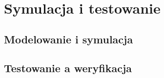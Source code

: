 \section{Symulacja i testowanie}
\label{sub:testowanie}



\subsection{Modelowanie i symulacja}
\label{sub:modelowanie}


\subsection{Testowanie a weryfikacja}
\label{sub:weryfikacja}

